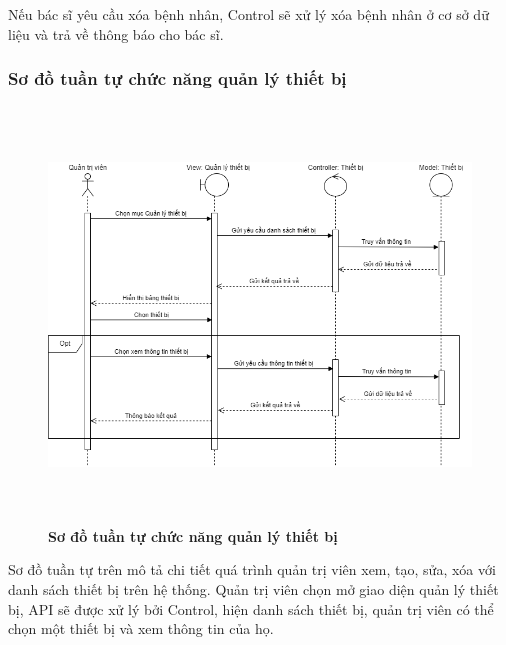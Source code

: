 Nếu bác sĩ yêu cầu xóa bệnh nhân, Control sẽ xử lý xóa bệnh nhân ở cơ sở dữ liệu và trả về thông báo cho bác sĩ.  


\subsubsection{Sơ đồ tuần tự chức năng quản lý thiết bị}
\begin{figure}[H]
  \centering
  \includegraphics[width=14cm,height=11cm]{Images/sequence/sequence_manage_device.png}
  \caption[Sơ đồ tuần tự chức năng quản lý thiết bị]{\bfseries \fontsize{12pt}{0pt}
  \selectfont Sơ đồ tuần tự chức năng quản lý thiết bị}
  \label{sequence_manage_device} %
\end{figure}
Sơ đồ tuần tự trên mô tả chi tiết quá trình quản trị viên xem, tạo, sửa, xóa với danh sách thiết bị trên hệ thống. Quản trị viên chọn mở giao diện quản lý thiết bị, 
API sẽ được xử lý bởi Control, hiện danh sách thiết bị, quản trị viên có thể chọn một thiết bị và xem thông tin của họ. 
